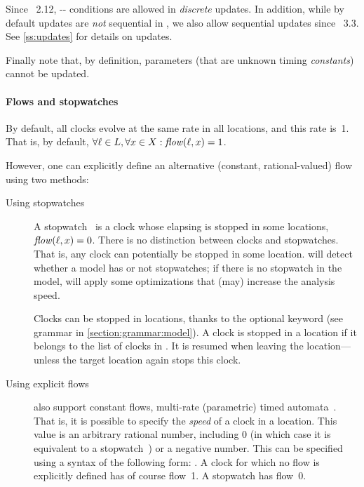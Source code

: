 Since \imitator{}~2.12, -- conditions are allowed in \emph{discrete} updates.
In addition, while by default updates are \emph{not} sequential in \imitator{}, we also allow sequential updates since \imitator{}~3.3.
See \cref{ss:updates} for details on updates.

Finally note that, by definition, parameters (that are unknown timing \emph{constants}) cannot be updated.

\paragraph{Flows and stopwatches}
By default, all clocks evolve at the same rate in all locations, and this rate is~1.
That is, by default, $\forall \ell \in L, \forall x \in X : \mathit{flow}(\ell, x) = 1$.

However, one can explicitly define an alternative (constant, rational-valued) flow using two methods:
\begin{description}
	\item [Using stopwatches]
A stopwatch~\cite{CL00} is a clock whose elapsing is stopped in some locations, \ie{} $\mathit{flow}(\ell, x) = 0$.
There is no distinction between clocks and stopwatches.
That is, any clock can potentially be stopped in some location.
\imitator{} will detect whether a model has or not stopwatches; if there is no stopwatch in the model, \imitator{} will apply some optimizations that (may) increase the analysis speed.

Clocks can be stopped in locations, thanks to the optional  keyword (see grammar in  \cref{section:grammar:model}).
A clock is stopped in a location if it belongs to the list of clocks in .
It is resumed when leaving the location---unless the target location again stops this clock.

\item [Using explicit flows]
\imitator{} also support constant flows, \ie{} multi-rate (parametric) timed automata~\cite{ACHHHNOSY95}.
That is, it is possible to specify the \emph{speed} of a clock in a location.
This value is an arbitrary rational number, including 0 (in which case it is equivalent to a stopwatch~\cite{CL00}) or a negative number.
This can be specified using a syntax of the following form: .
A clock for which no flow is explicitly defined has of course flow~1.
A stopwatch has flow~0.
\end{description}



